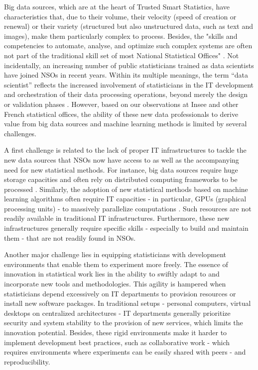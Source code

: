 Big data sources, which are at the heart of Trusted Smart Statistics, have characteristics that, due to their volume, their velocity (speed of creation or renewal) or their variety (structured but also unstructured data, such as text and images), make them particularly complex to process. Besides, the "skills and competencies to automate, analyse, and optimize such complex systems are often not part of the traditional skill set of most National Statistical Offices" \cite{ashofteh2021data}. Not incidentally, an increasing number of public statisticians trained as data scientists have joined NSOs in recent years. Within its multiple meanings, the term “data scientist” reflects the increased involvement of statisticians in the IT development and orchestration of their data processing operations, beyond merely the design or validation phases \cite{davenport2012data}. However, based on our observations at Insee and other French statistical offices, the ability of these new data professionals to derive value from big data sources and machine learning methods is limited by several challenges.

A first challenge is related to the lack of proper IT infrastructures to tackle the new data sources that NSOs now have access to as well as the accompanying need for new statistical methods. For instance, big data sources require huge storage capacities and often rely on distributed computing frameworks to be processed \cite{liu2013computing}. Similarly, the adoption of new statistical methods based on machine learning algorithms often require IT capacities - in particular, GPUs (graphical processing units) - to massively parallelize computations \cite{saiyeda2017cloud}. Such resources are not readily available in traditional IT infrastructures. Furthermore, these new infrastructures generally require specific skills - especially to build and maintain them - that are not readily found in NSOs.

Another major challenge lies in equipping statisticians with development environments that enable them to experiment more freely. The essence of innovation in statistical work lies in the ability to swiftly adapt to and incorporate new tools and methodologies. This agility is hampered when statisticians depend excessively on IT departments to provision resources or install new software packages. In traditional setups - personal computers, virtual desktops on centralized architectures -  IT departments generally prioritize security and system stability to the provision of new services, which limits the innovation potential. Besides, these rigid environments make it harder to implement development best practices, such as collaborative work - which requires environments where experiments can be easily shared with peers - and reproducibility.

